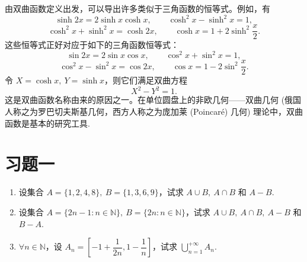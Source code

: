 由双曲函数定义出发，可以导出许多类似于三角函数的恒等式。例如，有
\[
  \sinh 2x=2\sinh x\cosh x,\qquad
  \cosh^2x-\sinh^2x=1,
\]
\[
  \cosh^2x+\sinh^2x=\cosh 2x,\qquad
  \cosh x=1+2\sinh^2\frac x2.
\]
这些恒等式正好对应于如下的三角函数恒等式：
\[
  \sin 2x=2\sin x\cos x,\qquad
  \cos^2x+\sin^2x=1,
\]
\[
  \cos^2x-\sin^2x=\cos 2x,\qquad
  \cos x=1-2\sin^2\frac x2.
\]
令 $X=\cosh x,\ Y=\sinh x$，则它们满足双曲方程
\[
  X^2-Y^2=1.
\]
这是双曲函数名称由来的原因之一。在单位圆盘上的非欧几何——双曲几何 (俄国人称之为罗巴切夫斯基几何，西方人称之为庞加莱 (Poincaré) 几何) 理论中，双曲函数是基本的研究工具.

\section*{习题一}
{}
\label{exercises:ma-1}

\begin{enumerate}
  \item 设集合 $A=\{1,2,4,8\},\ B=\{1,3,6,9\}$，试求 $A\cup B,\ A\cap B$ 和 $A-B$.
  \item 设集合 $A=\{2n-1:n\in\mathbb{N}\},\ B=\{2n:n\in\mathbb{N}\}$，试求 $A\cup B,\ A\cap B,\ A-B$ 和 $B-A$.
  \item $\forall n\in\mathbb{N}$，设 $A_n=\left[-1+\dfrac{1}{2n},1-\dfrac1n\right]$，试求 $\displaystyle\bigcup_{n=1}^{+\infty}A_n$.
\end{enumerate}





